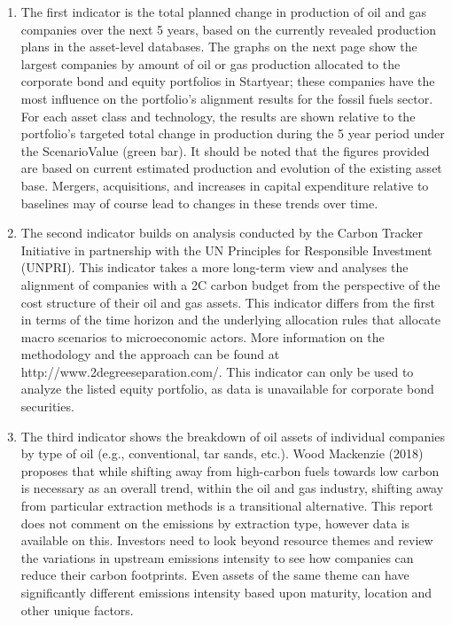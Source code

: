 \documentclass[10pt,table]{article}\usepackage[]{graphicx}\usepackage[]{color}
\begin{document}
\begin{multicols}{2}
		\begin{enumerate}
			\item The first indicator is the total planned change in production of oil and gas companies over the next 5 years, based on the currently revealed production plans in the asset-level databases. The graphs on the next page show the largest companies by amount of oil or gas production allocated to the corporate bond and equity portfolios in Startyear; these companies have the most influence on the portfolio's alignment results for the fossil fuels sector. For each asset class and technology, the results are shown relative to the portfolio's targeted total change in production during the 5 year period under the ScenarioValue (green bar). It should be noted that the figures provided are based on current estimated production and evolution of the existing asset base. Mergers, acquisitions, and increases in capital expenditure relative to baselines may of course lead to changes in these trends over time. 
			\item The second indicator builds on analysis conducted by the Carbon Tracker Initiative in partnership with the UN Principles for Responsible Investment (UNPRI). This indicator takes a more long-term view and analyses the alignment of companies with a 2\degree C carbon budget from the perspective of the cost structure of their oil and gas assets. This indicator differs from the first in terms of the time horizon and the underlying allocation rules that allocate macro scenarios to microeconomic actors. More information on the methodology and the approach can be found at http://www.2degreeseparation.com/. This indicator can only be used to analyze the listed equity portfolio, as data is unavailable for corporate bond securities. 
			\item The third indicator shows the breakdown of oil assets of individual companies by type of oil (e.g., conventional, tar sands, etc.). Wood Mackenzie (2018) proposes that while shifting away from high-carbon fuels towards low carbon is necessary as an overall trend, within the oil and gas industry, shifting away from particular extraction methods is a transitional alternative. This report does not comment on the emissions by extraction type, however data is available on this. Investors need to look beyond resource themes and review the variations in upstream emissions intensity to see how companies can reduce their carbon footprints. Even assets of the same theme can have significantly different emissions intensity based upon maturity, location and other unique factors.
		\end{enumerate}


\end{multicols}
\end{document}
